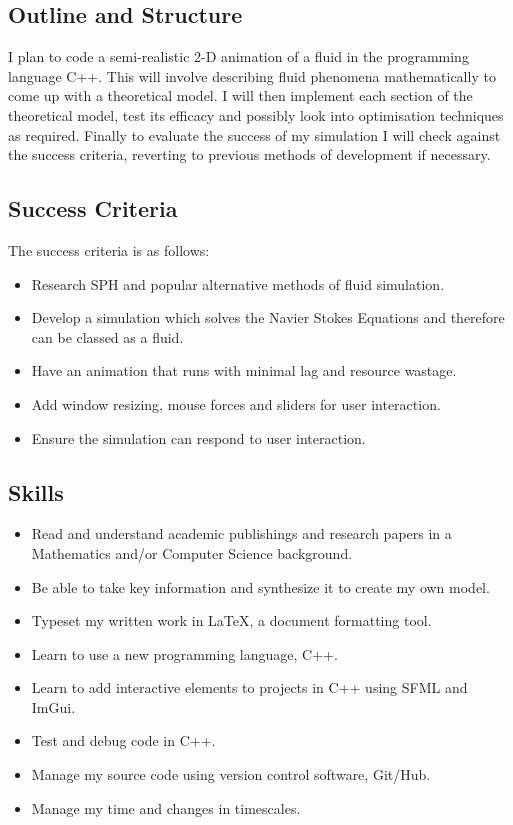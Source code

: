 \documentclass[write-up.tex]{subfiles}
\begin{document}
\subsection{Outline and Structure}
I plan to code a semi-realistic 2-D animation of a fluid in the programming language C++. This will involve describing fluid phenomena mathematically to come up with a theoretical model. I will then implement each section of the theoretical model, test its efficacy and possibly look into optimisation techniques as required. Finally to evaluate the success of my simulation I will check against the success criteria, reverting to previous methods of development if necessary.

\subsection{Success Criteria}
The success criteria is as follows:
\begin{itemize}
 \item Research SPH and popular alternative methods of fluid simulation.
 \item Develop a simulation which solves the Navier Stokes Equations and therefore can be classed as a fluid.
 \item Have an animation that runs with minimal lag and resource wastage.
 \item Add window resizing, mouse forces and sliders for user interaction.
 \item Ensure the simulation can respond to user interaction.
\end{itemize}
\subsection{Skills}
 \begin{itemize}
  \item Read and understand academic publishings and research papers in a Mathematics and/or Computer Science background.
  \item Be able to take key information and synthesize it to create my own model.
  \item Typeset my written work in LaTeX, a document formatting tool.
  \item Learn to use a new programming language, C++.
  \item Learn to add interactive elements to projects in C++ using SFML and ImGui.
  \item Test and debug code in C++.
  \item Manage my source code using version control software, Git/Hub.
  \item Manage my time and changes in timescales.
 \end{itemize}
 \clearpage
\end{document}

